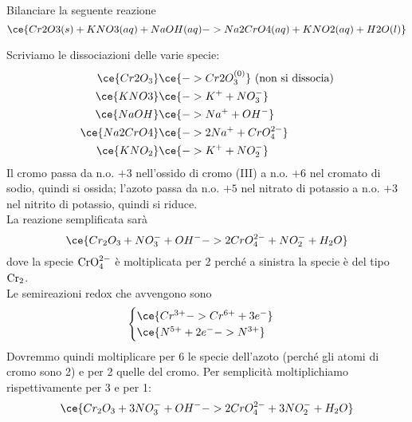 \begin{esercizio}
    Bilanciare la seguente reazione
    \begin{equation*}
        \ce{Cr2O3(s) + KNO3(aq) + NaOH(aq) -> Na2CrO4(aq) + KNO2(aq) + H2O(l)}
    \end{equation*}
\end{esercizio}
\begin{soluzione}
    Scriviamo le dissociazioni delle varie specie:
    \begin{equation*}
        \begin{split}
            \ce{Cr2O_3} & \ce{-> Cr2O_3^{(0)}} \text{ (non si dissocia)}
            \\
            \ce{KNO3} & \ce{-> K^+ + NO_3^-}
            \\
            \ce{NaOH} & \ce{-> Na^+ + OH^-}
            \\
            \ce{Na2CrO4} & \ce{-> 2Na^+ + CrO_4^{2-}}
            \\
            \ce{KNO_2} & \ce{-> K^+ + NO_2^-}
            \\
        \end{split}
    \end{equation*}
    Il cromo passa da n.o. $+3$ nell'ossido di cromo (III) a n.o. $+6$ nel cromato di sodio, quindi si ossida; l'azoto passa da n.o. $+5$ nel nitrato di potassio a n.o. $+3$ nel nitrito di potassio, quindi si riduce.\\
    La reazione semplificata sarà
    \begin{equation*}
        \ce{Cr_2O_3 + NO_3^- + OH^- -> 2CrO_4^{2-} + NO_2^- + H_2O}
    \end{equation*}
    dove la specie $\rm CrO_4^{2-}$ è moltiplicata per 2 perché a sinistra la specie è del tipo $\rm Cr_2$.\\
    Le semireazioni redox che avvengono sono
    \begin{equation*}
        \begin{cases}
            \ce{Cr^{3+} -> Cr^{6+} + 3e^-}\\
            \ce{N^{5+} + 2e^- -> N^{3+}}
        \end{cases}
    \end{equation*}
    Dovremmo quindi moltiplicare per 6 le specie dell'azoto (perché gli atomi di cromo sono 2) e per 2 quelle del cromo. Per semplicità moltiplichiamo rispettivamente per 3 e per 1:
    \begin{equation*}
        \ce{Cr_2O_3 + 3NO_3^- + OH^- -> 2CrO_4^{2-} + 3NO_2^- + H_2O}

\end{equation*}
\end{soluzione}
